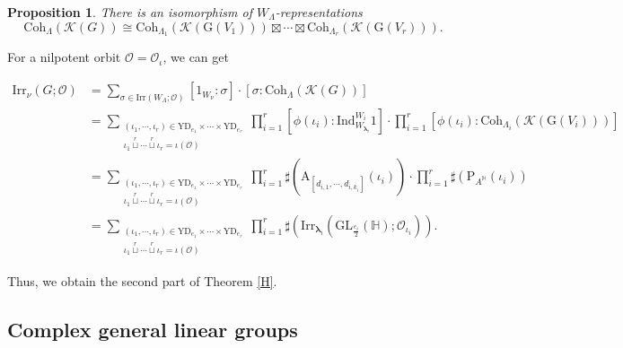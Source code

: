 \documentclass[12pt, a4paper]{amsart}
\numberwithin{equation}{section}
\newtheorem{prop}[thm]{Proposition}
\newcommand{\blam}{{\boldsymbol{\lambda}}}
\newcommand{\BH}{{\mathbb {H}}}
\newcommand{\CK}{{\mathcal {K}}}
\newcommand{\CO}{{\mathcal {O}}}
\newcommand{\GL}{{\mathrm{GL}}}
\newcommand{\G}{{\mathrm{G}}}
\newcommand{\Ind}{{\mathrm{Ind}}}
\newcommand{\Irr}{{\mathrm{Irr}}}
\begin{document}
\begin{prop}
    There is an isomorphism of $W_{\Lambda}$-representations
    \begin{equation}
        \mathrm{Coh}_{\Lambda}(\CK(G)) \cong \mathrm{Coh}_{\Lambda_1}(\CK(\G(V_1))) \boxtimes \cdots \boxtimes \mathrm{Coh}_{\Lambda_r}(\CK(\G(V_r))).
    \end{equation}
\end{prop}

For a nilpotent orbit $\CO = \CO_{\iota}$, we can get

\begin{align}
    \Irr_{\nu}(G;\CO) & = \sum_{\sigma \in \Irr(W_\Lambda;\CO)}[1_{W_\nu}:\sigma]\cdot[\sigma:\mathrm{Coh}_{\Lambda}(\CK(G))]\\
    & = \sum_{\substack{(\iota_1,\cdots,\iota_r) \in \mathrm{YD}_{e_1} \times \cdots \times \mathrm{YD}_{e_r} \\ \iota_1 \mathop{\sqcup}\limits^r \cdots  \mathop{\sqcup}\limits^r \iota_r = \iota(\CO)}}\prod_{i=1}^r [\phi(\iota_i): \Ind_{W_{\blam_i}}^{W_i}1]\cdot \prod_{i=1}^r[\phi(\iota_i):\mathrm{Coh}_{\Lambda_i}(\CK(\G(V_i)))]\\
    & = \sum_{\substack{(\iota_1,\cdots,\iota_r) \in \mathrm{YD}_{e_1} \times \cdots \times \mathrm{YD}_{e_r} \\ \iota_1 \mathop{\sqcup}\limits^r \cdots  \mathop{\sqcup}\limits^r \iota_r = \iota(\CO)}} \prod_{i=1}^{r}\sharp(\mathrm{A}_{[d_{i,1}, \cdots,d_{i,k_i}]}(\iota_i)) \cdot \prod_{i=1}^r \sharp(\mathrm{P}_{A^\BH}(\iota_i))\\
    & = \sum_{\substack{(\iota_1,\cdots,\iota_r) \in \mathrm{YD}_{e_1} \times \cdots \times \mathrm{YD}_{e_r} \\ \iota_1 \mathop{\sqcup}\limits^r \cdots  \mathop{\sqcup}\limits^r \iota_r = \iota(\CO)}} \prod_{i=1}^r \sharp(\Irr_{\blam_i}(\GL_{\frac{e_i}{2}}(\BH);\CO_{\iota_i})).
\end{align}

Thus, we obtain the second part of Theorem \ref{H}.










\subsection{Complex general linear groups}
\end{document}
